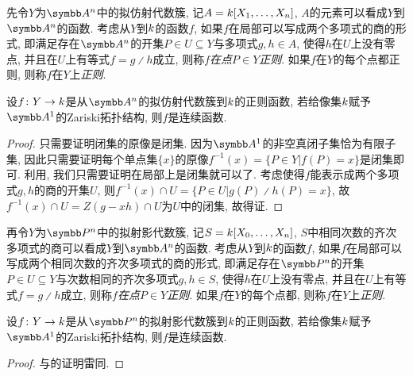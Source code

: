 \begin{definition}
  先令$Y$为$\AF^n$中的拟仿射代数簇, 记$A=k [X_1, \dotsc, X_n]$, $A$的元素可以看成$Y$到$\AF^n$的函数. 考虑从$Y$到$k$的函数$f$, 如果$f$在局部可以写成两个多项式的商的形式, 即满足存在$\AF^n$的开集$P\in U\subseteq Y$与多项式$g, h\in A$, 使得$h$在$U$上没有零点, 并且在$U$上有等式$f=g{\divslash}h$成立, 则称$f$\emph{在点$P\in Y$正则}. 如果$f$在$Y$的每个点都正则, 则称$f$在$Y$上\emph{正则}.
\end{definition}

\begin{proposition}\label{prop:affineregularcontinuous}
  设$f\colon Y\to k$是从$\AF^n$的拟仿射代数簇到$k$的正则函数, 若给像集$k$赋予$\AF^1$的Zariski拓扑结构, 则$f$是连续函数.
\end{proposition}

\begin{proof}
  只需要证明闭集的原像是闭集. 因为$\AF^1$的非空真闭子集恰为有限子集, 因此只需要证明每个单点集$\{x\}$的原像$f^{-1}(x)=\{P\in Y\vert f(P)=x\}$是闭集即可. 利用, 我们只需要证明在局部上是闭集就可以了. 考虑使得$f$能表示成两个多项式$g, h$的商的开集$U$, 则$f^{-1}(x)\cap U=\{P\in U\vert g(P){\divslash}h(P)=x\}$, 故$f^{-1}(x)\cap U=Z(g-xh)\cap U$为$U$中的闭集, 故得证.
\end{proof}

\begin{definition}
  再令$Y$为$\PP^n$中的拟射影代数簇, 记$S=k [X_0, \dotsc, X_n]$, $S$中相同次数的齐次多项式的商可以看成$Y$到$\AF^n$的函数. 考虑从$Y$到$k$的函数$f$, 如果$f$在局部可以写成两个相同次数的齐次多项式的商的形式, 即满足存在$\PP^n$的开集$P\in U\subseteq Y$与次数相同的齐次多项式$g, h\in S$, 使得$h$在$U$上没有零点, 并且在$U$上有等式$f=g{\divslash}h$成立, 则称$f$\emph{在点$P\in Y$正则}. 如果$f$在$Y$的每个点都, 则称$f$在$Y$上\emph{正则}.
\end{definition}

\begin{proposition}\label{prop:projregularcontinuous}
  设$f\colon Y\to k$是从$\PP^n$的拟射影代数簇到$k$的正则函数, 若给像集$k$赋予$\AF^1$的Zariski拓扑结构, 则$f$是连续函数.
\end{proposition}

\begin{proof}
  与的证明雷同.
\end{proof}

